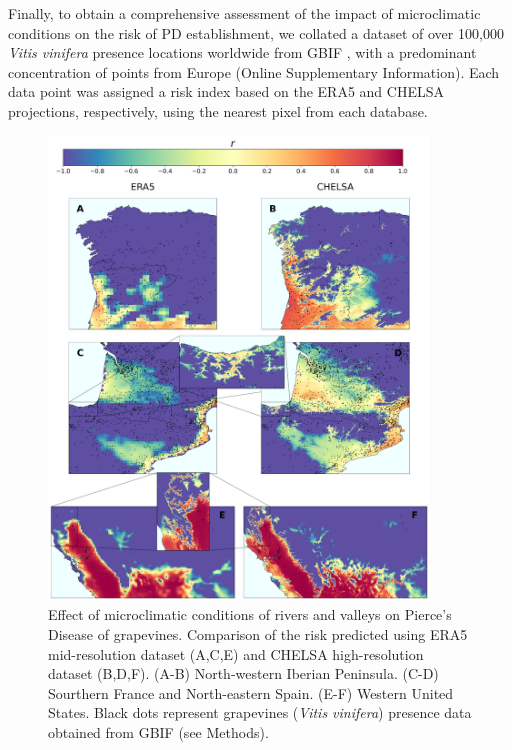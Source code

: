 Finally, to obtain a comprehensive assessment of the impact of
microclimatic conditions on the risk of PD establishment, we collated a dataset
of over 100,000 \textit {Vitis vinifera} presence locations worldwide from GBIF
\cite{GBIF}, with a predominant concentration of points from Europe
(Online Supplementary Information). Each data point was assigned a risk index
based on
the ERA5 and CHELSA projections, respectively, using the nearest pixel from
each database.

\begin{figure}[H]
    \centering
    \includegraphics[width=0.9\textwidth]{Figures/ERA5_vs_CHELSA_rivers.pdf}
    \caption{Effect of microclimatic conditions of rivers and valleys on
        Pierce's Disease of grapevines. Comparison of the risk predicted using
        ERA5
        mid-resolution dataset (A,C,E) and CHELSA high-resolution dataset
        (B,D,F).
        (A-B) North-western Iberian Peninsula. (C-D) Sourthern France and
        North-eastern
        Spain. (E-F) Western United States. Black dots represent grapevines
        (\textit{Vitis vinifera}) presence data obtained from GBIF (see
        Methods).}
    \label{fig:microclimates}
\end{figure}

